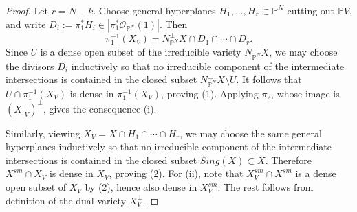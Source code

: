 \documentclass[12pt]{amsart}
\begin{document}
\begin{proof}
Let $r=N-k$. Choose general hyperplanes $H_1,\dots,H_r\subset \mathbb P^N$
cutting out $\mathbb PV$, and write
$D_i:=\pi_1^*H_i \in |\pi_1^*\mathcal O_{\mathbb P^N}(1)|$. Then
\[
\pi_1^{-1}(X_V)=N_{\mathbb P^N}^{\perp}X\cap D_1\cap\cdots\cap D_r.
\]
Since $U$ is a dense open subset of the irreducible variety
$N_{\mathbb P^N}^{\perp}X$, we may choose the divisors $D_i$ inductively so that
no irreducible component of the intermediate intersections is contained in the
closed subset $N_{\mathbb P^N}^{\perp}X\setminus U$.
It follows that
$U\cap \pi_1^{-1}(X_V)$
is dense in $\pi_1^{-1}(X_V)$, proving (1).
Applying $\pi_2$, whose image is $(X|_V)^\perp$, gives the consequence (i).

Similarly, viewing $X_V=X\cap H_1\cap\cdots\cap H_r$, we may choose the same
general hyperplanes inductively so that no irreducible component of the
intermediate intersections is contained in the closed subset $Sing(X)\subset X$.
Therefore $X^{sm}\cap X_V$
is dense in $X_V$, proving (2).
For (ii), note that
$X_V^{sm}\cap X^{sm}$
is a dense open subset of $X_V$ by (2), hence also dense in $X_V^{sm}$. The rest follows from definition of the dual variety $X_{V}^{\perp}$.
\end{proof}
\end{document}
